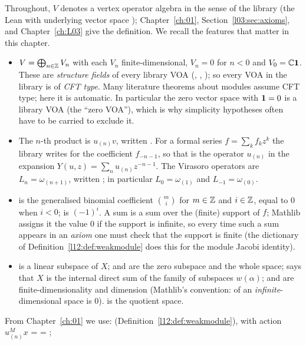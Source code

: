 Throughout, $V$ denotes a vertex operator algebra in the sense of the library (the Lean
 with underlying vector space ); Chapter~\ref{ch:01},
Section~\ref{l03:sec:axioms}, and Chapter~\ref{ch:L03} give the definition. We recall the features that
matter in this chapter.
\begin{itemize}
\item $V = \bigoplus_{n\in{\mathbb{Z}}}V_n$ with each $V_n$ finite-dimensional, $V_n = 0$ for $n<0$ and
  $V_0 = {\mathbb{C}}\mathbf{1}$. These are \emph{structure fields} of every library VOA
  (, , ); so every VOA in the library is of
  \emph{CFT type}. Many literature theorems about modules assume CFT type; here it is automatic. In
  particular the zero vector space with $\mathbf{1} = 0$ is a library VOA (the ``zero VOA''), which
  is why simplicity hypotheses often have to be carried to exclude it.
\item The $n$-th product is $u_{(n)}v$, written . For a formal series
  $f = \sum_k f_k z^k$ the library writes  for the coefficient
  $f_{-n-1}$, so that  is the operator $u_{(n)}$ in the expansion
  $Y(u,z) = \sum_n u_{(n)}z^{-n-1}$. The Virasoro operators are
  $L_n = \omega_{(n+1)}$, written ; in particular $L_0 = \omega_{(1)}$ and
  $L_{-1} = \omega_{(0)}$.
\item {} is the generalised binomial coefficient $\binom mi$ for $m\in{\mathbb{Z}}$ and $i\in{\mathbb{Z}}$, equal to
  $0$ when $i<0$;  is $(-1)^i$. A sum  is a sum over the (finite)
  support of $f$; Mathlib assigns it the value $0$ if the support is infinite, so every time such a
  sum appears in an \emph{axiom} one must check that the support is finite (the dictionary of
  Definition~\ref{l12:def:weakmodule} does this for the module Jacobi identity).
\item {} is a linear subspace of $X$;  and  are the zero subspace
  and the whole space;  says that $X$ is the internal direct sum of the
  family of subspaces $w(\alpha)$;  and  are
  finite-dimensionality and dimension (Mathlib's convention:  of an
  \emph{infinite}-dimensional space is $0$).  is the quotient space.
\end{itemize}
From Chapter~\ref{ch:01} we use:  (Definition~\ref{l12:def:weakmodule}), with
action $u^M_{(n)}x$ =  = ; 
